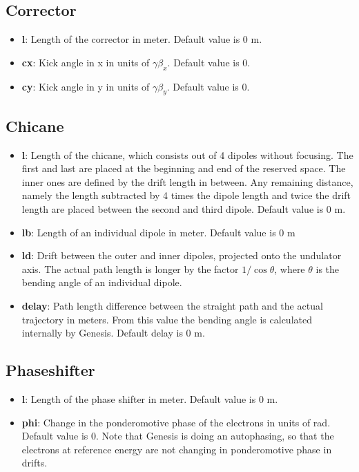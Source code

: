 \documentclass[12pt]{book}
\begin{document}
\subsection {\sf Corrector}

\begin{itemize}
\item {\bf l}: Length of the corrector in meter. Default value is 0 m.
\item {\bf cx}: Kick angle in x in units of $\gamma\beta_x$. Default value is 0.
\item {\bf cy}: Kick angle in y in units of $\gamma\beta_y$. Default value is 0.
\end{itemize}

\subsection {\sf Chicane}

\begin{itemize}
\item {\bf l}: Length of the chicane, which consists out of 4 dipoles without focusing. The first and last are placed at the beginning and end of the reserved space. The inner ones are defined by the drift length in between. Any remaining distance, namely the length subtracted by 4 times the dipole length and twice the drift length are placed between the second and third dipole. Default value is 0 m.
\item {\bf lb}: Length of an individual dipole in meter. Default value is 0 m
\item {\bf ld}: Drift between the outer and inner dipoles, projected onto the undulator axis. The actual path length is longer by the factor $1/\cos\theta$, where $\theta$ is the bending angle of an individual dipole.
\item {\bf delay}: Path length difference between the straight path and the actual trajectory in meters. From this value the bending angle is calculated internally by Genesis. Default delay is 0 m.
\end{itemize}

\subsection {\sf Phaseshifter}
\begin{itemize}
\item {\bf l}: Length of the phase shifter in meter. Default value is 0 m.
\item {\bf phi}: Change in the ponderomotive phase of the electrons in units of rad. Default value is 0. Note that Genesis is doing an autophasing, so that the electrons at reference energy are not changing in ponderomotive phase in drifts.
\end{itemize}
\end{document}
